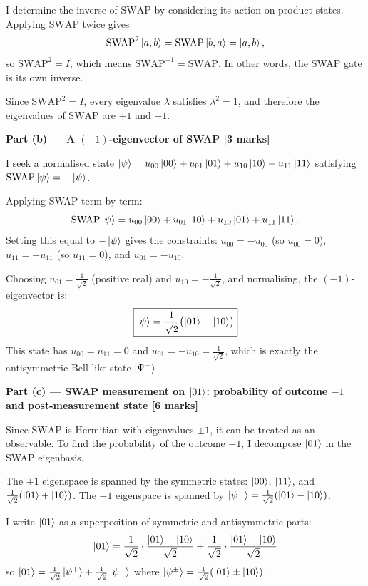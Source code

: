 \documentclass[12pt,a4paper]{article}
\begin{document}
\medskip
I determine the inverse of $\mathrm{SWAP}$ by considering its action on product states.
Applying $\mathrm{SWAP}$ twice gives
\[
  \mathrm{SWAP}^2\ket{a,b} = \mathrm{SWAP}\ket{b,a} = \ket{a,b},
\]
so $\mathrm{SWAP}^2 = I$, which means $\mathrm{SWAP}^{-1} = \mathrm{SWAP}$.
In other words, the SWAP gate is its own inverse.

Since $\mathrm{SWAP}^2 = I$, every eigenvalue $\lambda$ satisfies $\lambda^2 = 1$, and therefore the eigenvalues of $\mathrm{SWAP}$ are $+1$ and $-1$.

\medskip
\textbf{Part (b) --- A $(-1)$-eigenvector of SWAP [3 marks]}

\medskip
I seek a normalised state $\ket{\psi}=u_{00}\ket{00}+u_{01}\ket{01}+u_{10}\ket{10}+u_{11}\ket{11}$ satisfying $\mathrm{SWAP}\ket{\psi}=-\ket{\psi}$.

Applying SWAP term by term:
\[
  \mathrm{SWAP}\ket{\psi}
  = u_{00}\ket{00}+u_{01}\ket{10}+u_{10}\ket{01}+u_{11}\ket{11}.
\]
Setting this equal to $-\ket{\psi}$ gives the constraints:
$u_{00}=-u_{00}$ (so $u_{00}=0$),
$u_{11}=-u_{11}$ (so $u_{11}=0$),
and $u_{01}=-u_{10}$.

Choosing $u_{01}=\tfrac{1}{\sqrt{2}}$ (positive real) and $u_{10}=-\tfrac{1}{\sqrt{2}}$, and normalising, the $(-1)$-eigenvector is:
\[
  \boxed{\ket{\psi} = \frac{1}{\sqrt{2}}\bigl(\ket{01}-\ket{10}\bigr)}
\]
This state has $u_{00}=u_{11}=0$ and $u_{01}=-u_{10}=\tfrac{1}{\sqrt{2}}$, which is exactly the antisymmetric Bell-like state $\ket{\Psi^-}$.

\medskip
\textbf{Part (c) --- SWAP measurement on $\ket{01}$: probability of outcome $-1$ and post-measurement state [6 marks]}

\medskip
Since $\mathrm{SWAP}$ is Hermitian with eigenvalues $\pm1$, it can be treated as an observable.
To find the probability of the outcome $-1$, I decompose $\ket{01}$ in the SWAP eigenbasis.

The $+1$ eigenspace is spanned by the symmetric states: $\ket{00}$, $\ket{11}$, and $\tfrac{1}{\sqrt{2}}(\ket{01}+\ket{10})$.
The $-1$ eigenspace is spanned by $\ket{\psi^-} = \tfrac{1}{\sqrt{2}}(\ket{01}-\ket{10})$.

I write $\ket{01}$ as a superposition of symmetric and antisymmetric parts:
\[
  \ket{01} = \frac{1}{\sqrt{2}}\cdot\frac{\ket{01}+\ket{10}}{\sqrt{2}}
           + \frac{1}{\sqrt{2}}\cdot\frac{\ket{01}-\ket{10}}{\sqrt{2}}
\]
so $\ket{01} = \tfrac{1}{\sqrt{2}}\ket{\psi^+}+\tfrac{1}{\sqrt{2}}\ket{\psi^-}$ where $\ket{\psi^\pm}=\tfrac{1}{\sqrt{2}}(\ket{01}\pm\ket{10})$.
\end{document}
